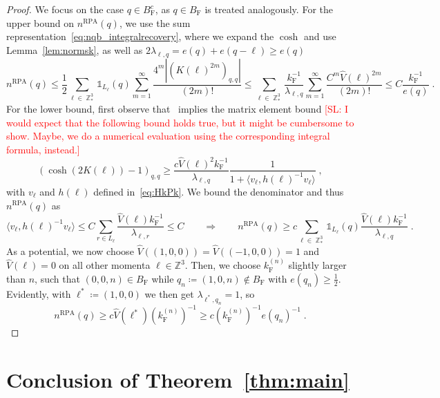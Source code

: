 \documentclass[12pt,a4paper]{article}
\numberwithin{equation}{section}
\newcommand{\ZZZ}{\mathbb{Z}}
\newcommand{\1}{\mathbb{I}}
\newcommand{\F}{\mathrm{F}}
\newcommand{\RPA}{\mathrm{RPA}}
\DeclareMathOperator{\Z}{\mathbb{Z}}
\newcommand{\half}{\frac{1}{2}}
\theoremstyle{plain}
\theoremstyle{definition}
\theoremstyle{remark}
\theoremstyle{plain}
\theoremstyle{definition}
\theoremstyle{remark}
\begin{document}
\begin{proof}
We focus on the case $ q \in B_{\F}^c $, as $ q \in B_{\F} $ is treated analogously. For the upper bound on $ n^{\RPA}(q) $, we use the sum representation~\eqref{eq:nqb_integralrecovery}, where we expand the $ \cosh $ and use Lemma~\ref{lem:normsk}, as well as $ 2 \lambda_{\ell,q} = e(q) + e(q - \ell) \ge e(q) $
\begin{equation}
	n^{\RPA}(q)
	\le \half \sum_{\ell \in \Z^3_*} \mathds{1}_{L_\ell}(q) \sum_{m=1}^{\infty} \frac{4^m |(K(\ell)^{2m})_{q,q}|}{(2m)!}
	\le \sum_{\ell \in \Z^3_*} \frac{k_{\F}^{-1}}{\lambda_{\ell,q}} \sum_{m=1}^{\infty} \frac{C^m \hat{V}(\ell)^{2m}}{(2m)!}
	\le C \frac{k_{\F}^{-1}}{e(q)} \;.
\end{equation}
For the lower bound, first observe that~\cite[Prop.~7.8]{CHN21} implies the matrix element bound \textcolor{red}{[SL: I would expect that the following bound holds true, but it might be cumbersome to show. Maybe, we do a numerical evaluation using the corresponding integral formula, instead.]}
\begin{equation}
	(\cosh(2K(\ell)) - 1)_{q,q}
	\ge \frac{c \hat{V}(\ell)^2 k_{\F}^{-1}}{\lambda_{\ell,q}}
		\frac{1}{1 + \langle v_\ell, h(\ell)^{-1} v_\ell \rangle} \;,
\end{equation}
with $ v_\ell $ and $ h(\ell) $ defined in~\eqref{eq:HkPk}. We bound the denominator and thus $ n^{\RPA}(q) $ as
\begin{equation}
	\langle v_\ell, h(\ell)^{-1} v_\ell \rangle \le C \sum_{r \in L_\ell} \frac{\hat{V}(\ell) k_{\F}^{-1}}{\lambda_{\ell,r}} \le C \qquad \Rightarrow \qquad
	n^{\RPA}(q)
	\ge c \sum_{\ell \in \Z^3_*} \mathds{1}_{L_\ell}(q)
		\frac{\hat{V}(\ell) k_{\F}^{-1}}{\lambda_{\ell,q}} \;.
\end{equation}
As a potential, we now choose $ \hat{V}((1,0,0)) = \hat{V}((-1,0,0)) = 1 $ and $ \hat{V}(\ell) = 0 $ on all other momenta $ \ell \in \ZZZ^3 $. Then, we choose $ k_{\F}^{(n)} $ slightly larger than $ n $, such that $ (0,0,n) \in B_{\F} $ while $ q_n \coloneq (1,0,n) \notin B_{\F} $ with $ e(q_n) \ge \half $. Evidently, with $ \ell^* \coloneq (1,0,0) $ we then get $ \lambda_{\ell^*, q_n} = 1 $, so
\begin{equation}
	n^{\RPA}(q)
	\ge c \hat{V}(\ell^*) (k_{\F}^{(n)})^{-1}
	\ge c (k_{\F}^{(n)})^{-1} e(q_n)^{-1} \;.
\end{equation}
\end{proof}



\section{Conclusion of Theorem~\ref{thm:main}}
\label{sec:mainthmproof}
\end{document}

